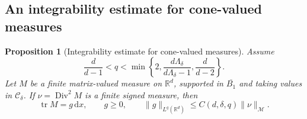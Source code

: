 \documentclass[11pt,a4paper,reqno]{amsart}
\theoremstyle{plain}
\newtheorem{proposition}[theorem]{Proposition}
\theoremstyle{remark}
\numberwithin{equation}{section}
\newcommand{\R}{\mathbb R}
\newcommand{\Cdelta}{\mathcal C_\delta}
\newcommand{\lam}{\Lambda_\delta}
\newcommand{\dd}{\,\mathrm d}
\newcommand{\norm}[1]{\lVert#1\rVert}
\newcommand{\TV}[1]{\norm{#1}_{\mathcal M}}
\DeclareMathOperator{\tr}{tr}
\DeclareMathOperator{\Div}{Div}
\begin{document}
\subsection{An integrability estimate for cone-valued measures}
\begin{proposition}[Integrability estimate for cone-valued measures]\label{prop:measure}
Assume
\begin{equation}\label{eq:full-q-range}
 \frac d{d-1}<q<\min\left\{2,\frac{d\lam}{d\lam-1},\frac d{d-2}\right\}.
\end{equation}
Let $M$ be a finite matrix-valued measure on $\R^d$, supported in $\overline{B_1}$ and taking values in $\Cdelta$. If $\nu=\Div^2M$ is a finite signed measure, then
\begin{equation}\label{eq:adjoint-density}
 \tr M=g\dd x,\qquad g\ge0,\qquad
 \norm{g}_{L^q(\R^d)}\le C(d,\delta,q)\TV{\nu}.
\end{equation}
\end{proposition}
\end{document}
